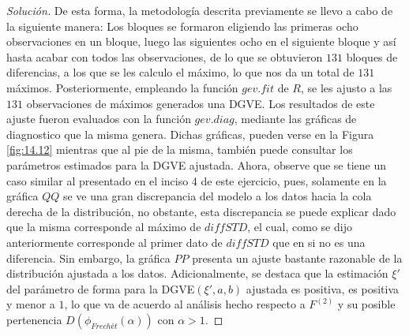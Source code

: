 \documentclass[10.5pt,notitlepage]{article}
\newenvironment{solucion}
  {\begin{proof}[Solución]}
  {\end{proof}}
\theoremstyle{plain}
\begin{document}
\begin{solucion}
De esta forma, la metodología descrita previamente se llevo a cabo de la siguiente manera: Los bloques se formaron eligiendo las primeras ocho observaciones en un bloque, luego las siguientes ocho en el siguiente bloque y así hasta acabar con todos las observaciones, de lo que se obtuvieron \(131\) bloques de diferencias, a los que se les calculo el máximo, lo que nos da un total de \(131\) máximos. Posteriormente, empleando la función \(gev.fit\) de \(R\), se les ajusto a las \(131\) observaciones de máximos generados una DGVE. Los resultados de este ajuste fueron evaluados con la función \(gev.diag\), mediante las gráficas de diagnostico que la misma genera. Dichas gráficas, pueden verse en la Figura \ref{fig:14.12} mientras que al pie de la misma, también puede consultar los parámetros estimados para la DGVE ajustada. Ahora, observe que se tiene un caso similar al presentado en el inciso 4 de este ejercicio, pues, solamente en la gráfica \(QQ\) se ve una gran discrepancia del modelo a los datos hacia la cola derecha de la distribución, no obstante, esta discrepancia se puede explicar dado que la misma corresponde al máximo de \(diffSTD\), el cual, como se dijo anteriormente corresponde al primer dato de \(diffSTD\) que en si no es una diferencia. Sin embargo, la gráfica \(PP\) presenta un ajuste bastante razonable de la distribución ajustada a los datos. Adicionalmente, se destaca que la estimación \(\xi'\) del parámetro de forma para la DGVE\((\xi',a,b)\) ajustada es positiva, es positiva y menor a \(1\), lo que va de acuerdo al análisis hecho respecto a \(F^{(2)}\) y su posible pertenencia \(D(\phi_{Frechét}(\alpha))\) con \(\alpha >1\).



\end{solucion}
\end{document}
